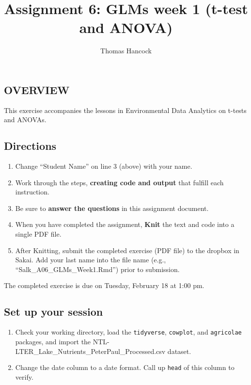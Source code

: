 \documentclass[
]{article}
\title{Assignment 6: GLMs week 1 (t-test and ANOVA)}
\author{Thomas Hancock}
\date{}
\providecommand{\tightlist}{%
  \setlength{\itemsep}{0pt}\setlength{\parskip}{0pt}}
\begin{document}
\maketitle

\hypertarget{overview}{%
\subsection{OVERVIEW}\label{overview}}

This exercise accompanies the lessons in Environmental Data Analytics on
t-tests and ANOVAs.

\hypertarget{directions}{%
\subsection{Directions}\label{directions}}

\begin{enumerate}
\def\labelenumi{\arabic{enumi}.}
\tightlist
\item
  Change ``Student Name'' on line 3 (above) with your name.
\item
  Work through the steps, \textbf{creating code and output} that fulfill
  each instruction.
\item
  Be sure to \textbf{answer the questions} in this assignment document.
\item
  When you have completed the assignment, \textbf{Knit} the text and
  code into a single PDF file.
\item
  After Knitting, submit the completed exercise (PDF file) to the
  dropbox in Sakai. Add your last name into the file name (e.g.,
  ``Salk\_A06\_GLMs\_Week1.Rmd'') prior to submission.
\end{enumerate}

The completed exercise is due on Tuesday, February 18 at 1:00 pm.

\hypertarget{set-up-your-session}{%
\subsection{Set up your session}\label{set-up-your-session}}

\begin{enumerate}
\def\labelenumi{\arabic{enumi}.}
\item
  Check your working directory, load the \texttt{tidyverse},
  \texttt{cowplot}, and \texttt{agricolae} packages, and import the
  NTL-LTER\_Lake\_Nutrients\_PeterPaul\_Processed.csv dataset.
\item
  Change the date column to a date format. Call up \texttt{head} of this
  column to verify.
\end{enumerate}
\end{document}
